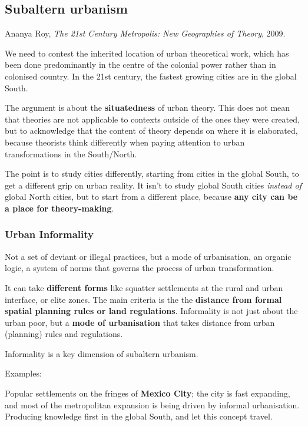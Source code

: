 \documentclass{article}
\begin{document}
\subsection{Subaltern urbanism}

Ananya Roy, \textit{The 21st Century Metropolis: New Geographies of Theory}, 2009.

We need to contest the inherited location of urban theoretical work, which has been done predominantly in the centre of the colonial power rather than in colonised country. In the 21st century, the fastest growing cities are in the global South.

The argument is about the \textbf{situatedness} of urban theory. This does not mean that theories are not applicable to contexts outside of the ones they were created, but to acknowledge that the content of theory depends on where it is elaborated, because theorists think differently when paying attention to urban transformations in the South/North.

The point is to study cities differently, starting from cities in the global South, to get a different grip on urban reality. It isn't to study global South cities \textit{instead of} global North cities, but to start from a different place, because \textbf{any city can be a place for theory-making}.

\subsubsection{Urban Informality}

Not a set of deviant or illegal practices, but a mode of urbanisation, an organic logic, a system of norms that governs the process of urban transformation. 

It can take \textbf{different forms} like squatter settlements at the rural and urban interface, or elite zones.
The main criteria is the the \textbf{distance from formal spatial planning rules or land regulations}.
Informality is not just about the urban poor, but a \textbf{mode of urbanisation} that takes distance from urban (planning) rules and regulations.

Informality is a key dimension of subaltern urbanism.

Examples:

Popular settlements on the fringes of \textbf{Mexico City}; the city is fast expanding, and most of the metropolitan expansion is being driven by informal urbanisation. Producing knowledge first in the global South, and let this concept travel.
\end{document}
